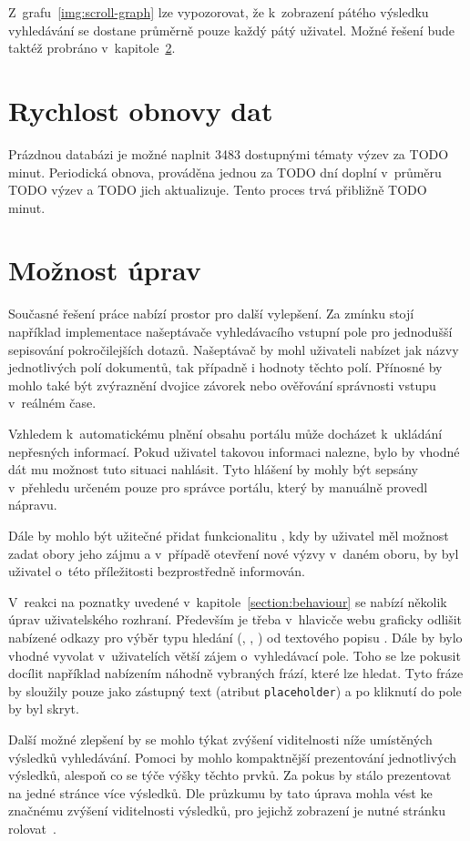 Z~grafu~\ref{img:scroll-graph} lze vypozorovat, že k~zobrazení pátého výsledku vyhledávání se dostane průměrně pouze každý pátý uživatel. Možné řešení bude taktéž probráno v~kapitole~\ref{section:improvements}.


\section{Rychlost obnovy dat}
Prázdnou databázi je možné naplnit 3483 dostupnými tématy výzev za TODO minut. Periodická obnova, prováděna jednou za TODO dní doplní v~průměru TODO výzev a TODO jich aktualizuje. Tento proces trvá přibližně TODO minut.


\section{Možnost úprav}\label{section:improvements}
Současné řešení práce nabízí prostor pro další vylepšení. Za zmínku stojí například implementace našeptávače vyhledávacího vstupní pole pro jednodušší sepisování pokročilejších dotazů. Našeptávač by mohl uživateli nabízet jak názvy jednotlivých polí dokumentů, tak případně i hodnoty těchto polí. Přínosné by mohlo také být zvýraznění dvojice závorek nebo ověřování správnosti vstupu v~reálném čase.

Vzhledem k~automatickému plnění obsahu portálu může docházet k~ukládání nepřesných informací. Pokud uživatel takovou informaci nalezne, bylo by vhodné dát mu možnost tuto situaci nahlásit. Tyto hlášení by mohly být sepsány v~přehledu určeném pouze pro správce portálu, který by manuálně provedl nápravu. 

Dále by mohlo být užitečné přidat funkcionalitu , kdy by uživatel měl možnost zadat obory jeho zájmu a v~případě otevření nové výzvy v~daném oboru, by byl uživatel o~této příležitosti bezprostředně informován.

V~reakci na poznatky uvedené v~kapitole~\ref{section:behaviour} se nabízí několik úprav uživatelského rozhraní. Především je třeba v~hlavicče webu graficky odlišit nabízené odkazy pro výběr typu hledání (, , ) od textového popisu .
Dále by bylo vhodné vyvolat v~uživatelích větší zájem o~vyhledávací pole. Toho se lze pokusit docílit například nabízením náhodně vybraných frází, které lze hledat. Tyto fráze by sloužily pouze jako zástupný text (atribut \texttt{placeholder}) a po kliknutí do pole by byl skryt. 

Další možné zlepšení by se mohlo týkat zvýšení viditelnosti níže umístěných výsledků vyhledávání. Pomoci by mohlo kompaktnější prezentování jednotlivých výsledků, alespoň co se týče výšky těchto prvků. Za pokus by stálo prezentovat na jedné stránce více výsledků. Dle průzkumu by tato úprava mohla vést ke značnému zvýšení viditelnosti výsledků, pro jejichž zobrazení je nutné stránku rolovat~\cite{bib:scroll}.



